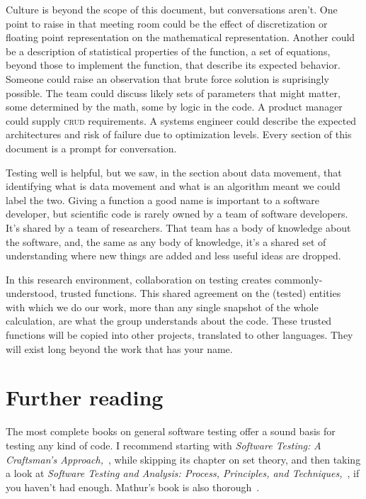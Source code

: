 \documentclass[fleqn,10pt]{olplainarticle}
\begin{document}
Culture is beyond the scope of this document, but conversations
aren't. One point to raise in that meeting room could
be the effect of discretization or floating point representation
on the mathematical representation. Another could be a
description of statistical properties of the function, a set
of equations, beyond those to implement the function, that
describe its expected behavior. Someone could raise an observation
that brute force solution is suprisingly possible.
The team could discuss likely sets of parameters that might
matter, some determined by the math, some by logic in the
code. A product manager could supply \textsc{crud} requirements.
A systems engineer could describe the expected architectures
and risk of failure due to optimization levels. Every section
of this document is a prompt for conversation.

Testing well is helpful, but we saw, in the section about
data movement, that identifying what is data movement
and what is an algorithm meant we could label the two.
Giving a function a good name is important to a software
developer, but scientific code is rarely owned by a team
of software developers. It's shared by a team of researchers.
That team has a body of knowledge about the software, and,
the same as any body of knowledge, it's a shared set of
understanding where new things are added and less useful
ideas are dropped.

In this research environment, collaboration on testing
creates commonly-understood, trusted functions. This shared
agreement on the (tested) entities with which we do our work, more
than any single snapshot of the whole calculation, are
what the group understands about the code. These trusted
functions will be copied into other projects, translated
to other languages. They will exist long beyond the work
that has your name.

\section{Further reading}\label{sec:further-reading}

The most complete books on general software testing offer a sound
basis for testing any kind of code. I recommend starting with
\emph{Software Testing: A Craftsman's Approach,}~\citep{jorgensen2013},
while skipping its chapter on set theory, and then taking a look at
\emph{Software Testing and Analysis: Process, Principles, and Techniques,}~\citep{pezze2008},
if you haven't had enough. Mathur's book is also thorough~\citep{mathur2013}.
\end{document}
